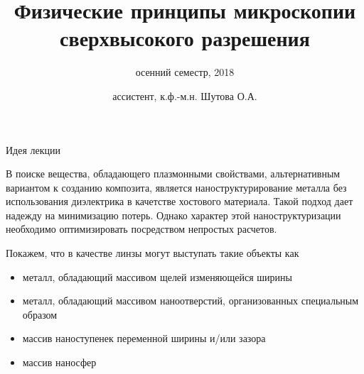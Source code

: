 \documentclass[9pt, compress, xcolor=table]{beamer}
\title{Физические принципы микроскопии сверхвысокого разрешения}
\subtitle{осенний семестр, 2018}
\author{ассистент, к.ф.-м.н. Шутова О.А.}
\institute{МГУ им. М.В. Ломоносова, физический факультет}
\begin{document}
\maketitle


\begin{frame}{Идея лекции}

В поиске вещества, обладающего плазмонными свойствами, альтернативным вариантом к созданию композита, является наноструктурирование металла без использования диэлектрика в качетстве хостового материала. Такой подход дает надежду на минимизацию потерь. Однако характер этой наноструктуризации необходимо оптимизировать посредством непростых расчетов. 

Покажем, что в качестве линзы могут выступать такие объекты как
\begin{itemize}
\item металл, обладающий массивом щелей изменяющейся ширины
\item металл, обладающий массивом наноотверстий, организованных специальным образом
\item массив наноступенек переменной ширины и/или зазора
\item массив наносфер
\end{itemize}

\end{frame}
\end{document}

